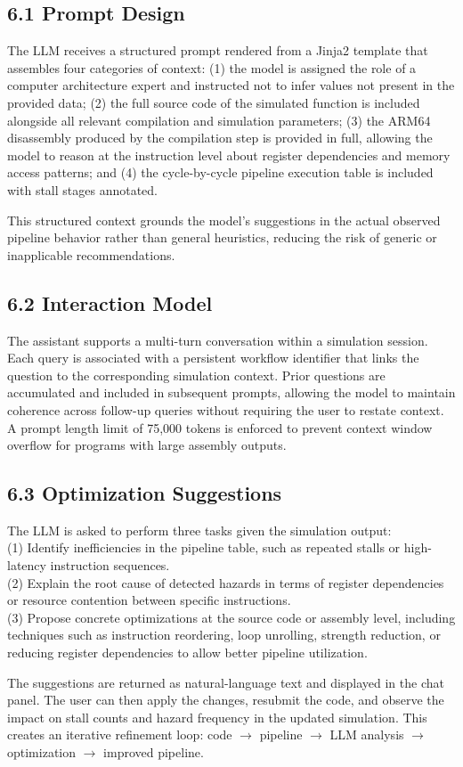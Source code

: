 \subsection*{6.1 Prompt Design}
The LLM receives a structured prompt rendered from a Jinja2 template that assembles four categories of context: (1) the model is assigned the role of a computer architecture expert and instructed not to infer values not present in the provided data; (2) the full source code of the simulated function is included alongside all relevant compilation and simulation parameters; (3) the ARM64 disassembly produced by the compilation step is provided in full, allowing the model to reason at the instruction level about register dependencies and memory access patterns; and (4) the cycle-by-cycle pipeline execution table is included with stall stages annotated.

This structured context grounds the model's suggestions in the actual observed pipeline behavior rather than general heuristics, reducing the risk of generic or inapplicable recommendations.

\subsection*{6.2 Interaction Model}
The assistant supports a multi-turn conversation within a simulation session. Each query is associated with a persistent workflow identifier that links the question to the corresponding simulation context. Prior questions are accumulated and included in subsequent prompts, allowing the model to maintain coherence across follow-up queries without requiring the user to restate context. A prompt length limit of 75,000 tokens is enforced to prevent context window overflow for programs with large assembly outputs.

\subsection*{6.3 Optimization Suggestions}

The LLM is asked to perform three tasks given the simulation output:\\
(1) Identify inefficiencies in the pipeline table, such as repeated stalls or high-latency instruction sequences. \\
(2) Explain the root cause of detected hazards in terms of register dependencies or resource contention between specific instructions.\\
(3) Propose concrete optimizations at the source code or assembly level, including techniques such as instruction reordering, loop unrolling, strength reduction, or reducing register dependencies to allow better pipeline utilization.

The suggestions are returned as natural-language text and displayed in the chat panel. The user can then apply the changes, resubmit the code, and observe the impact on stall counts and hazard frequency in the updated simulation. This creates an iterative refinement loop: code $\to$ pipeline $\to$ LLM analysis $\to$ optimization $\to$ improved pipeline.